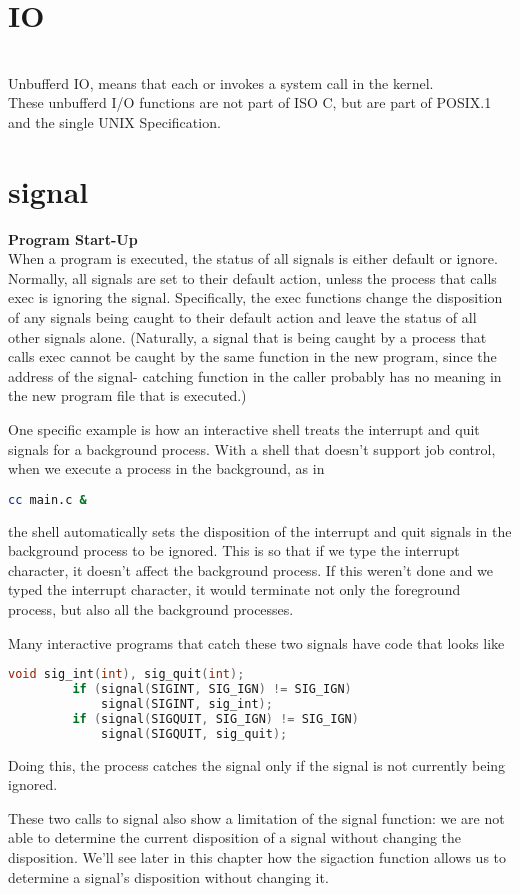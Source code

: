 \documentclass{article}
\begin{document}
\tableofcontents
\newpage
\section{IO}
\\
Unbufferd IO, means that each  or  invokes a system call in the kernel.\\
These unbufferd I/O functions are not part of ISO C, but are part of POSIX.1 and the single UNIX Specification.

\section{signal}
\textbf{Program Start-Up}\\
When a program is executed, the status of all signals is either default or ignore. Normally, all signals are set to their default action, 
unless the process that calls exec is ignoring the signal. Specifically, the exec functions change the disposition of 
any signals being caught to their default action and leave the status of all other signals alone. 
(Naturally, a signal that is being caught by a process that calls exec cannot be caught by the same function in the new program, 
since the address of the signal- catching function in the caller probably has no meaning in the new program file that is executed.)

One specific example is how an interactive shell treats the interrupt and quit signals for a background process. 
With a shell that doesn't support job control, when we execute a process in the background, as in
\begin{lstlisting}[language=sh]
    cc main.c &
\end{lstlisting}
the shell automatically sets the disposition of the interrupt and quit signals in the background process to be ignored. 
This is so that if we type the interrupt character, it doesn't affect the background process. 
If this weren't done and we typed the interrupt character, it would terminate not only the foreground process, but also all the background processes.

Many interactive programs that catch these two signals have code that looks like
\begin{lstlisting}[language=C]
         void sig_int(int), sig_quit(int);
         if (signal(SIGINT, SIG_IGN) != SIG_IGN)
             signal(SIGINT, sig_int);
         if (signal(SIGQUIT, SIG_IGN) != SIG_IGN)
             signal(SIGQUIT, sig_quit);
\end{lstlisting}
Doing this, the process catches the signal only if the signal is not currently being ignored.

These two calls to signal also show a limitation of the signal function: we are not able to determine the current disposition of a signal 
without changing the disposition. We'll see later in this chapter how the sigaction function allows us to determine a signal's disposition without changing it.
\end{document}
